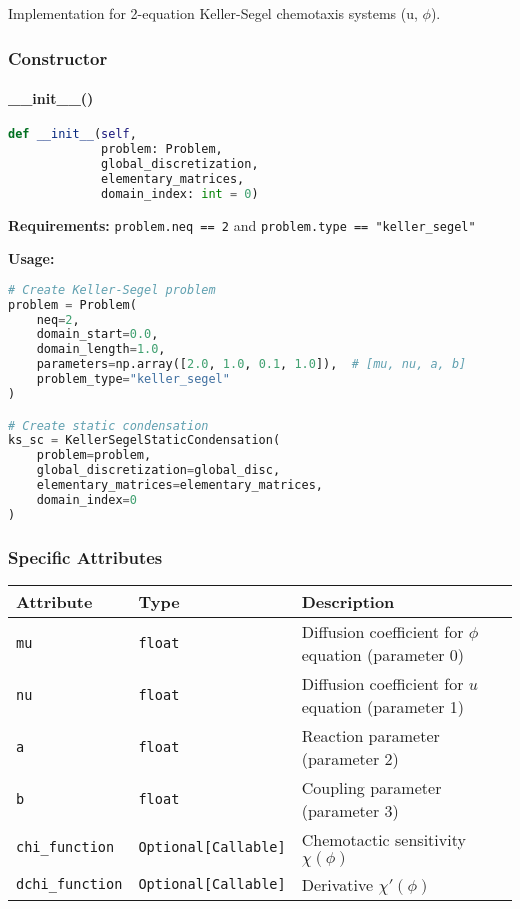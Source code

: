 Implementation for 2-equation Keller-Segel chemotaxis systems (u, $\phi$).

\subsubsection{Constructor}

\paragraph{\_\_init\_\_()}\leavevmode
\begin{lstlisting}[language=Python, caption=KellerSegel Constructor]
def __init__(self, 
             problem: Problem, 
             global_discretization, 
             elementary_matrices, 
             domain_index: int = 0)
\end{lstlisting}

\textbf{Requirements:} \texttt{problem.neq == 2} and \texttt{problem.type == "keller\_segel"}

\textbf{Usage:}
\begin{lstlisting}[language=Python, caption=KellerSegel Constructor Usage]
# Create Keller-Segel problem
problem = Problem(
    neq=2,
    domain_start=0.0,
    domain_length=1.0,
    parameters=np.array([2.0, 1.0, 0.1, 1.0]),  # [mu, nu, a, b]
    problem_type="keller_segel"
)

# Create static condensation
ks_sc = KellerSegelStaticCondensation(
    problem=problem,
    global_discretization=global_disc,
    elementary_matrices=elementary_matrices,
    domain_index=0
)
\end{lstlisting}

\subsubsection{Specific Attributes}

\begin{longtable}{|p{3.2cm}|p{3.5cm}|p{7cm}|}
\hline
\textbf{Attribute} & \textbf{Type} & \textbf{Description} \\
\hline
\endhead

\texttt{mu} & \texttt{float} & Diffusion coefficient for $\phi$ equation (parameter 0) \\
\hline

\texttt{nu} & \texttt{float} & Diffusion coefficient for $u$ equation (parameter 1) \\
\hline

\texttt{a} & \texttt{float} & Reaction parameter (parameter 2) \\
\hline

\texttt{b} & \texttt{float} & Coupling parameter (parameter 3) \\
\hline

\texttt{chi\_function} & \texttt{Optional[Callable]} & Chemotactic sensitivity $\chi(\phi)$ \\
\hline

\texttt{dchi\_function} & \texttt{Optional[Callable]} & Derivative $\chi'(\phi)$ \\
\hline

\end{longtable}

